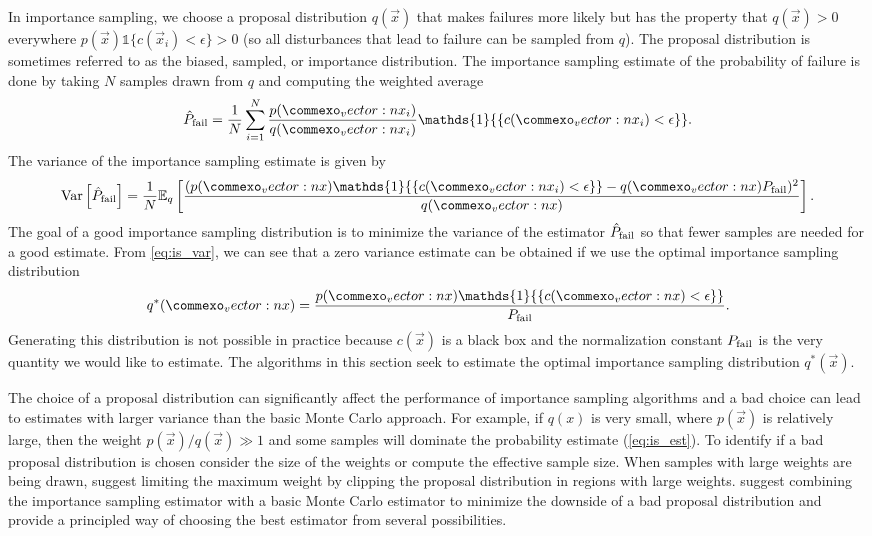 In importance sampling, we choose a proposal distribution $q(\vec{x})$ that makes failures more likely but has the property that $q(\vec{x}) > 0$ everywhere $p(\vec{x})\mathds{1}\{ c(\vec{x}_i) < \epsilon \} > 0$ (so all disturbances that lead to failure can be sampled from $q$). The proposal distribution is sometimes referred to as the biased, sampled, or importance distribution. The importance sampling estimate of the probability of failure is done by taking $N$ samples drawn from $q$ and computing the weighted average
\begin{equation}
    \hat{P}_{\rm fail} = \frac{1}{N} \sum_{i=1}^N \frac{p(\vec{x}_i)}{q(\vec{x}_i)} \mathds{1}{\{ c(\vec{x}_i) < \epsilon \}} \text{.} \label{eq:is_est}
\end{equation}
The variance of the importance sampling estimate is given by 
\begin{equation}
    {\rm Var}\left[\hat{P}_{\rm fail}  \right] = \frac{1}{N} \mathbb{E}_q \left[ \frac{(p(\vec{x})\mathds{1}{\{ c(\vec{x}_i) < \epsilon \}}  - q(\vec{x})P_{\rm fail})^2}{q(\vec{x})} \right] \text{.} \label{eq:is_var}
\end{equation}
The goal of a good importance sampling distribution is to minimize the variance of the estimator $\hat{P}_{\rm fail} $ so that fewer samples are needed for a good estimate. From \cref{eq:is_var}, we can see that a zero variance estimate can be obtained if we use the optimal importance sampling distribution
\begin{equation}
    q^*(\vec{x}) = \frac{p(\vec{x}) \mathds{1}{\{ c(\vec{x}) < \epsilon \}}} {P_{\rm fail}} \text{.}
\end{equation}
Generating this distribution is not possible in practice because $c(\vec{x})$ is a black box and the normalization constant $P_{\rm fail}$ is the very quantity we would like to estimate. The algorithms in this section seek to estimate the optimal importance sampling distribution $q^*(\vec{x})$.

The choice of a proposal distribution can significantly affect the performance of importance sampling algorithms and a bad choice can lead to estimates with larger variance than the basic Monte Carlo approach. For example, if $q(x)$ is very small, where $p(\vec{x})$ is relatively large, then the weight $p(\vec{x})/q(\vec{x}) \gg 1$ and some samples will dominate the probability estimate (\cref{eq:is_est}). To identify if a bad proposal distribution is chosen consider the size of the weights or compute the effective sample size. When samples with large weights are being drawn, \textcite{kim2016improving} suggest limiting the maximum weight by clipping the proposal distribution in regions with large weights. \textcite{uesato2019rigorous} suggest combining the importance sampling estimator with a basic Monte Carlo estimator to minimize the downside of a bad proposal distribution and \textcite{neufeld2014adaptive} provide a principled way of choosing the best estimator from several possibilities. 


